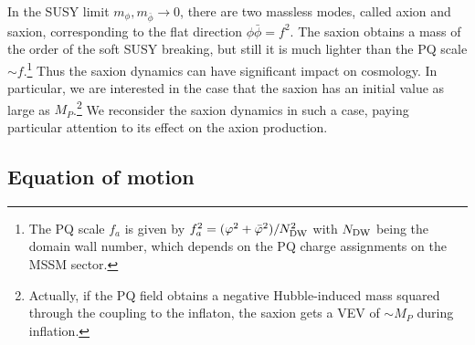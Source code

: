 \documentclass[12pt, a4paper]{article}
\begin{document}
In the SUSY limit $m_\phi, m_{\bar\phi}\to 0$, there are two massless modes, called axion and saxion,
corresponding to the flat direction $\phi\bar\phi = f^2$.
The saxion obtains a mass of the order of the soft SUSY breaking, but still it is much lighter than the PQ scale $\sim f$.\footnote{
	The PQ scale $f_a$ is given by $f_a^2 = (\varphi^2 + \bar\varphi^2)/N_{\rm DW}^2$
	with $N_{\rm DW}$ being the domain wall number, which depends on the PQ charge assignments on the MSSM sector.
}
Thus the saxion dynamics can have significant impact on cosmology.
In particular, we are interested in the case that the saxion has an initial value as large as $M_P$.\footnote{
	Actually, if the PQ field obtains a negative Hubble-induced mass squared through the coupling to the inflaton,
	the saxion gets a VEV of $\sim M_P$ during inflation.
}
We reconsider the saxion dynamics in such a case, paying particular attention to its effect on the axion production.



\subsection{Equation of motion}
\end{document}
